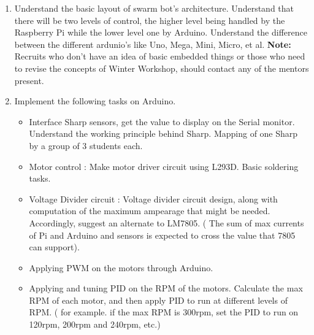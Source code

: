 \documentclass{article}
\begin{document}
\begin{enumerate}%

\item Understand the basic layout of swarm bot's architecture. Understand that there will be two levels of control, the higher level being handled by the Raspberry Pi while the lower level one by Arduino. Understand the difference between the different ardunio's like Uno, Mega, Mini, Micro, et al.
{\newline}{\newline}
{\bf Note:} Recruits who don't have an idea of basic embedded things or those who need to revise the concepts of Winter Workshop, should contact any of the mentors present.

\item Implement the following tasks on Arduino.
    \begin{itemize}
        \item Interface Sharp sensors, get the value to display on the Serial monitor. Understand the working principle behind Sharp. Mapping of one Sharp by a group of 3 students each.
        \item Motor control : Make motor driver circuit using L293D. Basic soldering tasks.
        \item Voltage Divider circuit : Voltage divider circuit design, along with computation of the maximum ampearage that might be needed. Accordingly, suggest an alternate to LM7805. ( The sum of max currents of Pi and Arduino and sensors is expected to cross the value that 7805 can support).
        \item Applying PWM on the motors through Arduino.
        \item Applying and tuning PID on the RPM of the motors. Calculate the max RPM of each motor, and then apply PID to run at different levels of RPM. ( for example. if the max RPM is 300rpm, set the PID to run on 120rpm, 200rpm and 240rpm, etc.)
    \end{itemize}


\end{enumerate}
\end{document}
